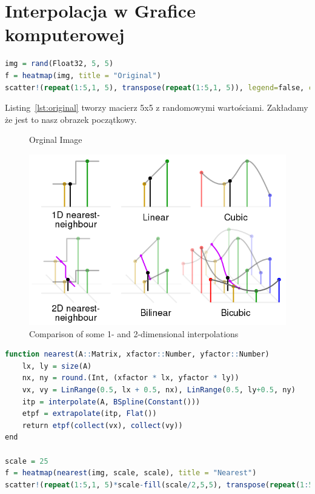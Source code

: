 \documentclass[12pt, a4paper]{article}
\begin{document}
\section{Interpolacja w Grafice komputerowej}
\begin{lstlisting}[caption={Original Image},language=R,label={lst:original}]
img = rand(Float32, 5, 5)
f = heatmap(img, title = "Original")
scatter!(repeat(1:5,1, 5), transpose(repeat(1:5,1, 5)), legend=false, color = :white)
\end{lstlisting}
Listing~\ref{lst:original} tworzy macierz 5x5 z randomowymi wartościami. Zakładamy że jest to nasz obrazek początkowy.
\begin{figure}[ht!]
	\centering    
	\def\svgwidth{\columnwidth}
	
	\caption{Orginal Image}
	\label{fig:original}
\end{figure}
\begin{figure}[ht!]
	\centering
	\includegraphics[scale=0.]{2dInterpolation.png}
	\caption{Comparison of some 1- and 2-dimensional interpolations} 
	\label{fig:2dInterpolation}      
\end{figure}
\clearpage
\begin{lstlisting}[caption={Interpolacja nearest},language=R,label={lst:nearest}]
function nearest(A::Matrix, xfactor::Number, yfactor::Number)
	lx, ly = size(A)
	nx, ny = round.(Int, (xfactor * lx, yfactor * ly))
	vx, vy = LinRange(0.5, lx + 0.5, nx), LinRange(0.5, ly+0.5, ny)
	itp = interpolate(A, BSpline(Constant()))
	etpf = extrapolate(itp, Flat())
	return etpf(collect(vx), collect(vy))
end

scale = 25
f = heatmap(nearest(img, scale, scale), title = "Nearest")
scatter!(repeat(1:5,1, 5)*scale-fill(scale/2,5,5), transpose(repeat(1:5,1, 5)*scale-fill(scale/2,5,5)), legend=false, color = :white)
\end{lstlisting}
\end{document}
